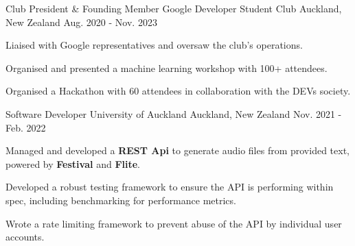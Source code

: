 \begin{cventries}
  \cventry
    {Club President \& Founding Member} %
    {Google Developer Student Club} %
    {Auckland, New Zealand} %
    {Aug. 2020 - Nov. 2023} %
    {
      \begin{cvitems} %
        \item {Liaised with Google representatives and oversaw the club's operations.}
        \item {Organised and presented a machine learning workshop with 100+ attendees.}
        \item {Organised a Hackathon with 60 attendees in collaboration with the DEVs society.}
      \end{cvitems}
    }

  \cventry
    {Software Developer} %
    {University of Auckland} %
    {Auckland, New Zealand} %
    {Nov. 2021 - Feb. 2022} %
    {
      \begin{cvitems} %
        \item {Managed and developed a \textbf{REST Api} to generate audio files from provided text, powered by \textbf{Festival} and \textbf{Flite}.}
        \item {Developed a robust testing framework to ensure the API is performing within spec, including benchmarking for performance metrics.}
        \item {Wrote a rate limiting framework to prevent abuse of the API by individual user accounts.}
      \end{cvitems}
    }




\end{cventries}
